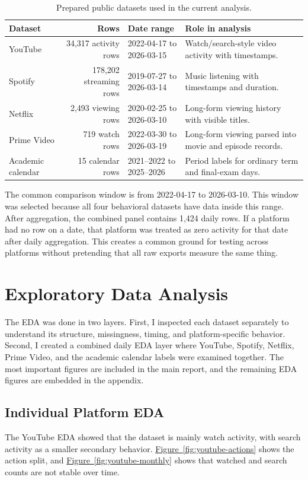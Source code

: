 \documentclass[11pt,a4paper]{article}
\newcommand{\figref}[1]{\hyperref[#1]{Figure~\ref*{#1}}}
\begin{document}
\begin{table}[H]
\centering
\small
\caption{Prepared public datasets used in the current analysis.}
\label{tab:datasets}
\begin{tabularx}{\textwidth}{l r l X}
\toprule
\textbf{Dataset} & \textbf{Rows} & \textbf{Date range} & \textbf{Role in analysis}\\
\midrule
YouTube & 34,317 activity rows & 2022-04-17 to 2026-03-15 & Watch/search-style video activity with timestamps.\\
Spotify & 178,202 streaming rows & 2019-07-27 to 2026-03-14 & Music listening with timestamps and duration.\\
Netflix & 2,493 viewing rows & 2020-02-25 to 2026-03-10 & Long-form viewing history with visible titles.\\
Prime Video & 719 watch rows & 2022-03-30 to 2026-03-19 & Long-form viewing parsed into movie and episode records.\\
Academic calendar & 15 calendar rows & 2021--2022 to 2025--2026 & Period labels for ordinary term and final-exam days.\\
\bottomrule
\end{tabularx}
\end{table}

The common comparison window is from 2022-04-17 to 2026-03-10. This window was selected because all four behavioral datasets have data inside this range. After aggregation, the combined panel contains 1,424 daily rows. If a platform had no row on a date, that platform was treated as zero activity for that date after daily aggregation. This creates a common ground for testing across platforms without pretending that all raw exports measure the same thing.

\section*{Exploratory Data Analysis}
The EDA was done in two layers. First, I inspected each dataset separately to understand its structure, missingness, timing, and platform-specific behavior. Second, I created a combined daily EDA layer where YouTube, Spotify, Netflix, Prime Video, and the academic calendar labels were examined together. The most important figures are included in the main report, and the remaining EDA figures are embedded in the appendix.

\subsection*{Individual Platform EDA}
The YouTube EDA showed that the dataset is mainly watch activity, with search activity as a smaller secondary behavior. \figref{fig:youtube-actions} shows the action split, and \figref{fig:youtube-monthly} shows that watched and search counts are not stable over time.
\end{document}
